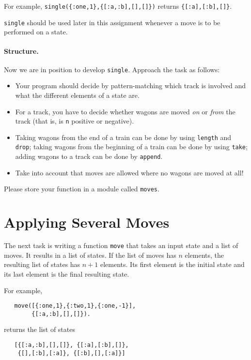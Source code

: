 \documentclass[a4paper,11pt]{article}
\begin{document}
For example, \verb+single({:one,1},{[:a,:b],[],[]})+ returns
\verb+{[:a],[:b],[]}+.

\verb+single+ should be used later in this assignment whenever a
move is to be performed on a state.

\paragraph{Structure.}

Now we are in position to develop \verb+single+. Approach the
task as follows:
\begin{itemize}
  
\item Your program should decide by pattern-matching which track
  is involved and what the different elements of a state are.
  
\item For a track, you have to decide whether wagons are moved
  \emph{on} or \emph{from} the track (that is, is \verb+n+  positive
  or negative).
  
\item Taking wagons from the end of a train can be done by using
  \verb+length+ and \verb+drop+; taking wagons from the beginning of a
  train can be done by using \verb+take+; adding wagons to a track
  can be done by \verb+append+.

\item Take into account that moves are allowed where no wagons
  are moved at all!
\end{itemize}

Please store your function in a module called \verb+moves+.

\section{Applying Several Moves}

The next task is writing a function \verb+move+ that takes an
input state and a list of moves. It results in a list of
states. If the list of moves has $n$ elements, the resulting list
of states has $n+1$ elements. Its first element is the initial
state and its last element is the final resulting state.

For example,
\begin{verbatim}
   move([{:one,1},{:two,1},{:one,-1}],
        {[:a,:b],[],[]}).
\end{verbatim}
returns the list of states
\begin{verbatim}
   [{[:a,:b],[],[]}, {[:a],[:b],[]}, 
    {[],[:b],[:a]}, {[:b],[],[:a]}]
\end{verbatim}
\end{document}
